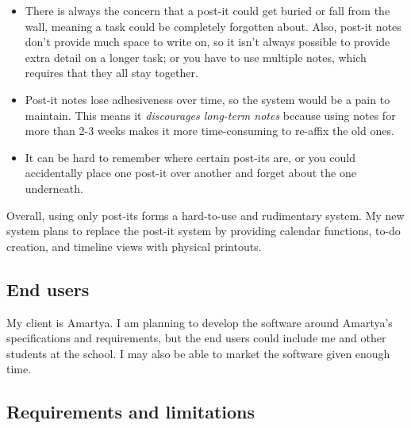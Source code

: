 \begin{itemize}

  \item There is always the concern that a post-it could get buried or fall
        from the wall, meaning a task could be completely forgotten about.
        Also, post-it notes don't provide much space to write on, so it isn't
        always possible to provide extra detail on a longer task; or you have to
        use multiple notes, which requires that they all stay together.
  \item Post-it notes lose adhesiveness over time, so the system would be a pain
        to maintain. This means it \textit{discourages long-term notes} because
        using notes for more than 2-3 weeks makes it more time-consuming to
        re-affix the old ones.
  \item It can be hard to remember where certain post-its are, or you could
        accidentally place one post-it over another and forget about the one
        underneath.

\end{itemize}

Overall, using only post-its forms a hard-to-use and rudimentary system. My new
system plans to replace the post-it system by providing calendar functions,
to-do creation, and timeline views with physical printouts.


\subsection{End users}

My client is Amartya. I am planning to develop the software around Amartya's
specifications and requirements, but the end users could include me and other
students at the school. I may also be able to market the software given enough
time.


\subsection{Requirements and limitations}

